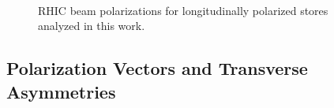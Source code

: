 \begin{figure}
   \\
  \caption{RHIC beam polarizations for longitudinally polarized stores analyzed in this work.}
  \label{fig:beam-polarizations}
\end{figure}

\subsection{Polarization Vectors and Transverse Asymmetries}

